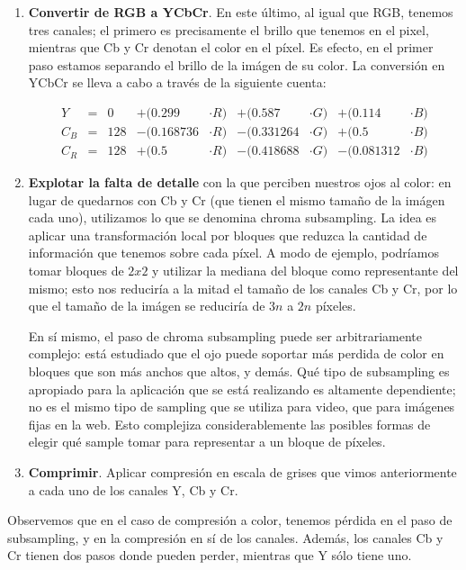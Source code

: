 \documentclass{article}
\begin{document}
\begin{enumerate}
\item
	{\bf Convertir de RGB a YCbCr}.
	En este último, al igual que RGB, tenemos tres canales; el primero es precisamente el brillo que tenemos en el pixel, mientras que Cb y Cr denotan el color en el píxel. Es efecto, en el primer paso estamos separando el brillo de la imágen de su color. La conversión en YCbCr se lleva a cabo a través de la siguiente cuenta:

	\begin{align}
		Y &=&  0 &+ (0.299  & \cdot R) &+ (0.587  & \cdot G) &+ (0.114  & \cdot B)\\
		C_B &=& 128 & - (0.168736 & \cdot R) &- (0.331264 & \cdot G) &+ (0.5   & \cdot B)\\
		C_R &=& 128 &+ (0.5   & \cdot R) &- (0.418688 & \cdot G) &- (0.081312 & \cdot B)
	\end{align}

\item
	{\bf Explotar la falta de detalle} con la que perciben nuestros ojos al color: en lugar de quedarnos con Cb y Cr (que tienen el mismo tamaño de la imágen cada uno), utilizamos lo que se denomina chroma subsampling. La idea es aplicar una transformación local por bloques que reduzca la cantidad de información que tenemos sobre cada píxel. A modo de ejemplo, podríamos tomar bloques de $2x2$ y utilizar la mediana del bloque como representante del mismo; esto nos reduciría a la mitad el tamaño de los canales Cb y Cr, por lo que el tamaño de la imágen se reduciría de $3n$ a $2n$ píxeles.

	En sí mismo, el paso de chroma subsampling puede ser arbitrariamente complejo: está estudiado que el ojo puede soportar más perdida de color en bloques que son más anchos que altos, y demás. Qué tipo de subsampling es apropiado para la aplicación que se está realizando es altamente dependiente; no es el mismo tipo de sampling que se utiliza para video, que para imágenes fijas en la web. Esto complejiza considerablemente las posibles formas de elegir qué sample tomar para representar a un bloque de píxeles.

\item
	{\bf Comprimir}.
	Aplicar compresión en escala de grises que vimos anteriormente a cada uno de los canales Y, Cb y Cr.
\end{enumerate}

Observemos que en el caso de compresión a color, tenemos pérdida en el paso de subsampling, y en la compresión en sí de los canales. Además, los canales Cb y Cr tienen dos pasos donde pueden perder, mientras que Y sólo tiene uno.
\end{document}
